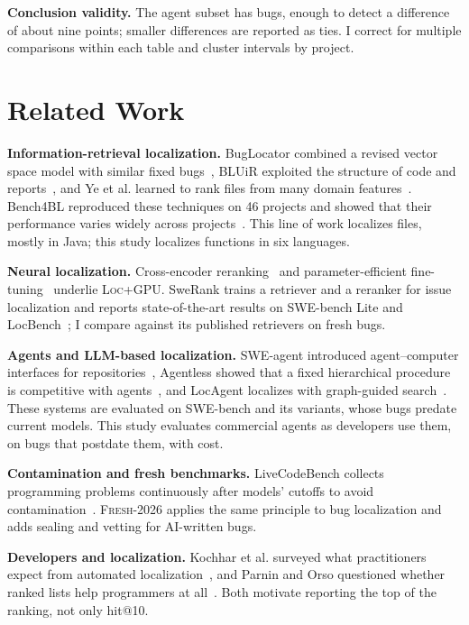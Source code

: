 \documentclass[acmsmall,screen,review,anonymous]{acmart}
\newcommand{\tool}{\textsc{Loc}\xspace}
\newcommand{\tool}{Allfather\xspace}
\newcommand{\toolgpu}{\tool{}+GPU\xspace}
\newcommand{\fresh}{\textsc{Fresh-2026}\xspace}
\begin{document}
\textbf{Conclusion validity.} The agent subset has \NAgent{} bugs, enough to detect a difference of about nine points; smaller differences are reported as ties. I correct for multiple comparisons within each table and cluster intervals by project.

\section{Related Work}
\label{sec:related}

\textbf{Information-retrieval localization.} BugLocator combined a revised vector space model with similar fixed bugs~\cite{zhou2012buglocator}, BLUiR exploited the structure of code and reports~\cite{saha2013bluir}, and Ye et al. learned to rank files from many domain features~\cite{ye2014learning}. Bench4BL reproduced these techniques on 46 projects and showed that their performance varies widely across projects~\cite{lee2018bench4bl}. This line of work localizes files, mostly in Java; this study localizes functions in six languages.

\textbf{Neural localization.} Cross-encoder reranking~\cite{nogueira2019passage} and parameter-efficient fine-tuning~\cite{hu2022lora} underlie \toolgpu. SweRank trains a retriever and a reranker for issue localization and reports state-of-the-art results on SWE-bench Lite and LocBench~\cite{reddy2025swerank}; I compare against its published retrievers on fresh bugs.

\textbf{Agents and LLM-based localization.} SWE-agent introduced agent--computer interfaces for repositories~\cite{yang2024sweagent}, Agentless showed that a fixed hierarchical procedure is competitive with agents~\cite{xia2024agentless}, and LocAgent localizes with graph-guided search~\cite{chen2025locagent}. These systems are evaluated on SWE-bench and its variants, whose bugs predate current models. This study evaluates commercial agents as developers use them, on bugs that postdate them, with cost.

\textbf{Contamination and fresh benchmarks.} LiveCodeBench collects programming problems continuously after models' cutoffs to avoid contamination~\cite{jain2024livecodebench}. \fresh applies the same principle to bug localization and adds sealing and vetting for AI-written bugs.

\textbf{Developers and localization.} Kochhar et al. surveyed what practitioners expect from automated localization~\cite{kochhar2016practitioners}, and Parnin and Orso questioned whether ranked lists help programmers at all~\cite{parnin2011automated}. Both motivate reporting the top of the ranking, not only hit@10.
\end{document}
